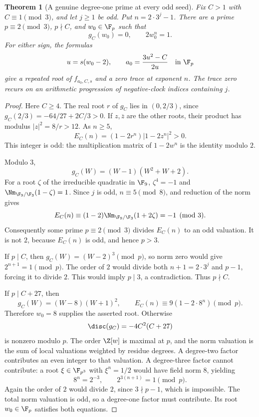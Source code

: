 \documentclass[11pt,a4paper]{article}
\newtheorem{theorem}{Theorem}[section]
\theoremstyle{definition}\newtheorem{definition}[theorem]{Definition}
\theoremstyle{remark}\newtheorem{remark}[theorem]{Remark}
\begin{document}
\begin{theorem}[A genuine degree-one prime at every odd seed]\label{R08:thm:seed}
Fix $C>1$ with $C\equiv1\pmod3$, and let $j\ge1$ be odd.
Put $n=2\cdot3^j-1$. There are a prime $p\equiv2\pmod3$,
$p\nmid C$, and $w_0\in\F_p$ such that
\[
                       g_C(w_0)=0,\qquad 2w_0^n=1.
\]
For either sign, the formulas
\begin{equation}\label{R08:eq:reconstruct}
 u=s(w_0-2),\qquad a_0=\frac{3u^2-C}{2u}\quad\text{in }\F_p
\end{equation}
give a repeated root of $f_{a_0,C,s}$ and a zero trace at exponent $n$.
The trace zero recurs on an arithmetic progression of negative-clock
indices containing $j$.
\end{theorem}
\begin{proof}
Here $C\ge4$. The real root $r$ of $g_C$ lies in $(0,2/3)$, since
$g_C(2/3)=-64/27+2C/3>0$.
If $z,\overline z$ are the other roots, their product has modulus
$|z|^2=8/r>12$. As $n\ge5$,
\[
                 E_C(n)=(1-2r^n)|1-2z^n|^2>0.
\]
This integer is odd: the multiplication matrix of $1-2w^n$ is the
identity modulo $2$.

Modulo $3$,
\[
                     g_C(W)=(W-1)(W^2+W+2).
\]
For a root $\zeta$ of the irreducible quadratic in $\F_9$,
$\zeta^4=-1$ and $\Nm_{\F_9/\F_3}(1-\zeta)=1$.
Since $j$ is odd, $n\equiv5\pmod8$, and reduction of the norm gives
\[
 E_C(n)\equiv(1-2)\Nm_{\F_9/\F_3}(1+2\zeta)
                     =-1\pmod3.
\]
Consequently some prime $p\equiv2\pmod3$ divides $E_C(n)$ to an
odd valuation. It is not $2$, because $E_C(n)$ is odd, and hence $p>3$.

If $p\mid C$, then $g_C(W)=(W-2)^3\pmod p$, so norm zero would give
$2^{n+1}=1\pmod p$. The order of $2$ would divide both
$n+1=2\cdot3^j$ and $p-1$, forcing it to divide $2$.
This would imply $p\mid3$, a contradiction. Thus $p\nmid C$.

If $p\mid C+27$, then
\[
       g_C(W)=(W-8)(W+1)^2,\qquad
       E_C(n)\equiv9(1-2\cdot8^n)\pmod p.
\]
Therefore $w_0=8$ supplies the asserted root.
Otherwise
\[
                         \disc(g_C)=-4C^2(C+27)
\]
is nonzero modulo $p$. The order $\Z[w]$ is maximal at $p$, and the
norm valuation is the sum of local valuations weighted by residue degrees.
A degree-two factor contributes an even integer to that valuation.
A degree-three factor cannot contribute: a root $\xi\in\F_{p^3}$
with $\xi^n=1/2$ would have field norm $8$, yielding
\[
                         8^n=2^{-3},\qquad 2^{3(n+1)}=1\pmod p.
\]
Again the order of $2$ would divide $2$, since $3\nmid p-1$, which
is impossible. The total norm valuation is odd, so a degree-one
factor must contribute. Its root $w_0\in\F_p$ satisfies both equations.


\end{proof}
\end{document}
